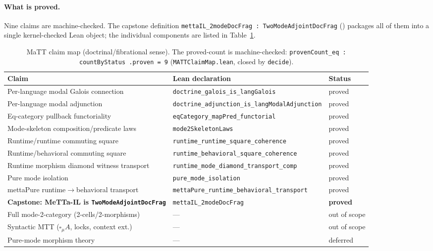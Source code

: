 \documentclass[11pt]{article}
\newcommand{\code}[1]{\texttt{#1}}
\newcommand{\codepath}[1]{\path{#1}}
\begin{document}
\paragraph{What is proved.}
Nine claims are machine-checked.
The capstone definition
\code{mettaIL\_2modeDocFrag : TwoModeAdjointDocFrag}
(\codepath{MATTFragment.lean}) packages all of them into a single
kernel-checked Lean object; the individual components are listed in
Table~\ref{tab:matt}.

\begin{table}[h]
\centering
\begin{tabular}{lll}
\toprule
Claim & Lean declaration & Status \\
\midrule
Per-language modal Galois connection &
  \code{doctrine\_galois\_is\_langGalois} & proved \\
Per-language modal adjunction &
  \code{doctrine\_adjunction\_is\_langModalAdjunction} & proved \\
Eq-category pullback functoriality &
  \code{eqCategory\_mapPred\_functorial} & proved \\
Mode-skeleton composition/predicate laws &
  \code{mode2SkeletonLaws} & proved \\
Runtime/runtime commuting square &
  \code{runtime\_runtime\_square\_coherence} & proved \\
Runtime/behavioral commuting square &
  \code{runtime\_behavioral\_square\_coherence} & proved \\
Runtime morphism diamond witness transport &
  \code{runtime\_mode\_diamond\_transport\_comp} & proved \\
Pure mode isolation &
  \code{pure\_mode\_isolation} & proved \\
mettaPure runtime$\to$behavioral transport &
  \code{mettaPure\_runtime\_behavioral\_transport} & proved \\
\textbf{Capstone: MeTTa-IL is \code{TwoModeAdjointDocFrag}} &
  \code{mettaIL\_2modeDocFrag} & \textbf{proved} \\
\midrule
Full mode-2-category (2-cells/2-morphisms) & --- & out of scope \\
Syntactic MTT ($\square_\mu A$, locks, context ext.) & --- & out of scope \\
Pure-mode morphism theory & --- & deferred \\
\bottomrule
\end{tabular}
\caption{MaTT claim map (doctrinal/fibrational sense).  The proved-count is
  machine-checked: \code{provenCount\_eq : countByStatus .proven = 9}
  (\texttt{MATTClaimMap.lean}, closed by \code{decide}).}
\label{tab:matt}
\end{table}
\end{document}
